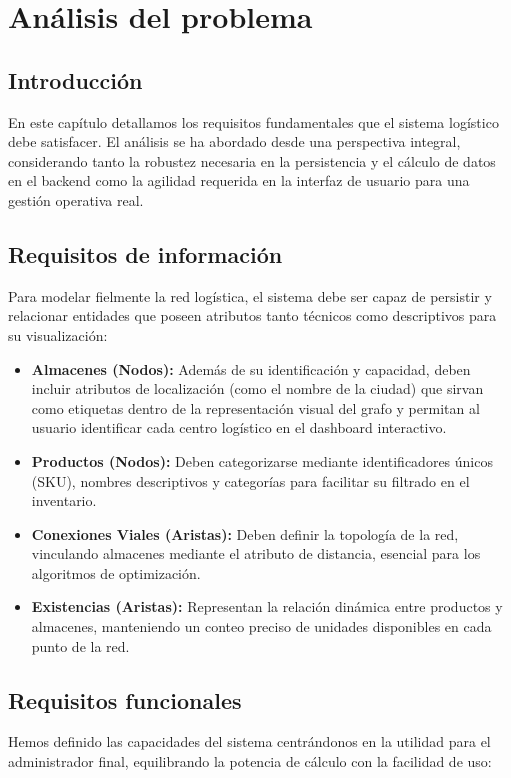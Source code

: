 \chapter{Análisis del problema}\label{cap:analisis}

\section{Introducción}
En este capítulo detallamos los requisitos fundamentales que el sistema logístico debe satisfacer. El análisis se ha abordado desde una perspectiva integral, considerando tanto la robustez necesaria en la persistencia y el cálculo de datos en el backend  como la agilidad requerida en la interfaz de usuario para una gestión operativa real.

\section{Requisitos de información}
Para modelar fielmente la red logística, el sistema debe ser capaz de persistir y relacionar entidades que poseen atributos tanto técnicos como descriptivos para su visualización:

\begin{itemize}
    \item \textbf{Almacenes (Nodos):} Además de su identificación y capacidad, deben incluir atributos de localización (como el nombre de la ciudad) que sirvan como etiquetas dentro de la representación visual del grafo y permitan al usuario identificar cada centro logístico en el dashboard interactivo.
    \item \textbf{Productos (Nodos):} Deben categorizarse mediante identificadores únicos (SKU), nombres descriptivos y categorías para facilitar su filtrado en el inventario.
    \item \textbf{Conexiones Viales (Aristas):} Deben definir la topología de la red, vinculando almacenes mediante el atributo de distancia, esencial para los algoritmos de optimización.
    \item \textbf{Existencias (Aristas):} Representan la relación dinámica entre productos y almacenes, manteniendo un conteo preciso de unidades disponibles en cada punto de la red.
\end{itemize}

\section{Requisitos funcionales}
Hemos definido las capacidades del sistema centrándonos en la utilidad para el administrador final, equilibrando la potencia de cálculo con la facilidad de uso:

